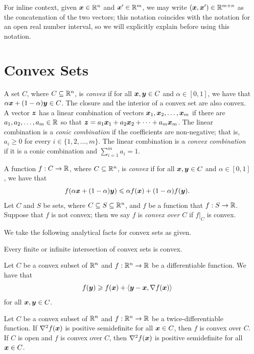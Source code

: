 For inline context, given ${\boldsymbol x}\in\mathbb R^n$ and ${\boldsymbol x}' \in \mathbb R^m$, we may write $({\boldsymbol x}, {\boldsymbol x}')\in\mathbb R^{m+n}$ as the concatenation of the two vectors; this notation coincides with the notation for an open real number interval, so we will explicitly explain before using this notation. 

\section{Convex Sets}

A set $C$, where $C\subseteq\mathbb R^n$, is {\em convex} if for all ${\boldsymbol x}, {\boldsymbol y}\in C$ and $\alpha\in [0, 1]$, we have that $\alpha {\boldsymbol x} + (1-\alpha) {\boldsymbol y}\in C$. The closure and the interior of a convex set are also convex. A vector ${\boldsymbol z}$ has a linear combination of vectors ${\boldsymbol x}_1, {\boldsymbol x}_2, \dots, {\boldsymbol x}_m$ if there are $a_1, a_2, \dots, a_m\in\mathbb R$ so that ${\boldsymbol z} = a_1 {\boldsymbol x}_1 + a_2 {\boldsymbol x}_2 + \dots + a_m {\boldsymbol x}_m$. The linear combination is a {\em conic combination} if the coefficients are non-negative; that is, $a_i\geq 0$ for every $i\in\{1,2,\dots,m\}$. The linear combination is a {\em convex combination} if it is a conic combination and $\sum_{i=1}^m a_i = 1$. 

\begin{definition}
A function $f: C \to \mathbb R$, where $C\subseteq \mathbb R^n$, is {\em convex} if for all ${\boldsymbol x}, {\boldsymbol y}\in C$ and $\alpha\in[0, 1]$, we have that 
$$ f(\alpha {\boldsymbol x} + (1 -\alpha) {\boldsymbol y}) \leqslant \alpha f({\boldsymbol x})  + (1 - \alpha) f({\boldsymbol y}). $$
Let $C$ and $S$ be sets, where $C\subseteq S\subseteq \mathbb R^n$, and $f$ be a function that $f: S\to\mathbb R$. Suppose that $f$ is not convex; then we say $f$ is {\em convex over $C$} if $f|_C$ is convex.  
\end{definition}

We take the following analytical facts for convex sets as given.  

\begin{proposition}\label{prop: convex intersection}
Every finite or infinite intersection of convex sets is convex. \hfill\qedsymbol
\end{proposition}

\begin{proposition}
Let $C$ be a convex subset of $\mathbb R^n$ and $f:\mathbb R^n\to\mathbb R$ be a differentiable function. We have that 
$$ f({\boldsymbol y}) \geqslant f({\boldsymbol x}) + \left\langle{\boldsymbol y} - {\boldsymbol x}, \nabla f({\boldsymbol x})\right\rangle $$
for all ${\boldsymbol x}, {\boldsymbol y}\in C$. \hfill\qedsymbol
\end{proposition}

\begin{proposition}
Let $C$ be a convex subset of $\mathbb R^n$ and $f:\mathbb R^n\to\mathbb R$ be a twice-differentiable function. If $\nabla^2 f({\boldsymbol x})$ is positive semidefinite for all ${\boldsymbol x}\in C$, then $f$ is convex over $C$. If $C$ is open and $f$ is convex over $C$, then $\nabla^2 f({\boldsymbol x})$ is positive semidefinite for all ${\boldsymbol x}\in C$. \hfill\qedsymbol
\end{proposition}

